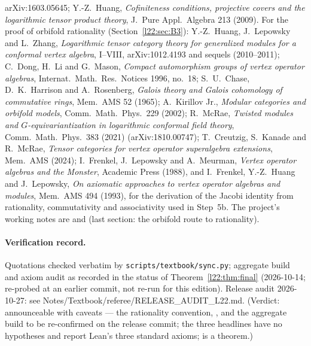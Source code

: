 arXiv:1603.05645; Y.-Z.~Huang, \emph{Cofiniteness conditions, projective
covers and the logarithmic tensor product theory}, J.\ Pure Appl.\ Algebra 213 (2009). For the proof of orbifold rationality
(Section~\ref{l22:sec:B3}): Y.-Z.~Huang, J.~Lepowsky and L.~Zhang, \emph{Logarithmic tensor category theory for generalized
modules for a conformal vertex algebra}, I--VIII, arXiv:1012.4193 and sequels (2010--2011); C.~Dong, H.~Li and G.~Mason,
\emph{Compact automorphism groups of vertex operator algebras}, Internat.\ Math.\ Res.\ Notices 1996, no.~18; S.~U.~Chase,
D.~K.~Harrison and A.~Rosenberg, \emph{Galois theory and Galois cohomology of commutative rings}, Mem.\ AMS 52 (1965);
A.~Kirillov Jr., \emph{Modular categories and orbifold models}, Comm.\ Math.\ Phys.\ 229 (2002); R.~McRae, \emph{Twisted
modules and $G$-equivariantization in logarithmic conformal field theory}, Comm.\ Math.\ Phys.\ 383 (2021)
(arXiv:1810.00747); T.~Creutzig, S.~Kanade and R.~McRae, \emph{Tensor categories for vertex operator superalgebra
extensions}, Mem.\ AMS (2024); I.~Frenkel, J.~Lepowsky and A.~Meurman, \emph{Vertex operator algebras and the Monster},
Academic Press (1988), and I.~Frenkel, Y.-Z.~Huang and J.~Lepowsky, \emph{On axiomatic approaches to vertex operator
algebras and modules}, Mem.\ AMS 494 (1993), for the derivation of the Jacobi identity from rationality, commutativity
and associativity used in Step~5b. The project's working notes are
 and  (last
section: the orbifold route to rationality).

\paragraph{Verification record.} Quotations checked verbatim by \texttt{scripts/textbook/sync.py}; aggregate build and
axiom audit as recorded in the status of Theorem~\ref{l22:thm:final} (2026-10-14; re-probed at an earlier commit, not re-run for this edition).
Release audit 2026-10-27: see Notes/Textbook/referee/RELEASE\_AUDIT\_L22.md. (Verdict: announceable with caveats --- the
rationality convention, , and the aggregate build to be re-confirmed on the release commit; the three
headlines have no hypotheses and report Lean's three standard axioms;  is a theorem.)

\endgroup
